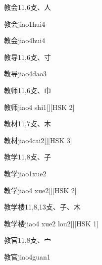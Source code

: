 \begin{entry}{教会}{11,6}{⽁、⼈}
  \begin{phonetics}{教会}{jiao1hui4}
  \end{phonetics}
  \begin{phonetics}{教会}{jiao4hui4}
  \end{phonetics}
\end{entry}

\begin{entry}{教导}{11,6}{⽁、⼨}
  \begin{phonetics}{教导}{jiao4dao3}
  \end{phonetics}
\end{entry}

\begin{entry}{教师}{11,6}{⽁、⼱}
  \begin{phonetics}{教师}{jiao4 shi1}[][HSK 2]
  \end{phonetics}
\end{entry}

\begin{entry}{教材}{11,7}{⽁、⽊}
  \begin{phonetics}{教材}{jiao4cai2}[][HSK 3]
  \end{phonetics}
\end{entry}

\begin{entry}{教学}{11,8}{⽁、⼦}
  \begin{phonetics}{教学}{jiao1xue2}
  \end{phonetics}
  \begin{phonetics}{教学}{jiao4 xue2}[][HSK 2]
  \end{phonetics}
\end{entry}

\begin{entry}{教学楼}{11,8,13}{⽁、⼦、⽊}
  \begin{phonetics}{教学楼}{jiao4 xue2 lou2}[][HSK 1]
  \end{phonetics}
\end{entry}

\begin{entry}{教官}{11,8}{⽁、⼧}
  \begin{phonetics}{教官}{jiao4guan1}
  \end{phonetics}
\end{entry}

